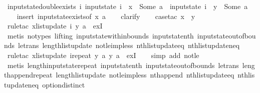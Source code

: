 \begin{isabellebody}
\endisatagproof
{\isafoldproof}%
%
\isadelimproof
\isanewline
%
\endisadelimproof
\isanewline
{}\isamarkupfalse%
\ input{}state{\isacharunderscore}double{\isacharunderscore}exists{\isacharcolon}\ {\isachardoublequoteopen}{\isasymexists}i{\isachardot}\ input{}state\ i\ {\isachardollar}\ x\ {\isacharequal}\ Some\ a\ {\isasymand}\ input{}state\ i\ {\isachardollar}\ y\ {\isacharequal}\ Some\ a{\isachardoublequoteclose}\isanewline
%
\isadelimproof
\ \ %
\endisadelimproof
%
\isatagproof
{}\isamarkupfalse%
\ {\isacharparenleft}insert\ input{}state{\isacharunderscore}exists{\isacharbrackleft}of\ x\ a{\isacharbrackright}{\isacharparenright}\isanewline
\ \ \isamarkupfalse%
\ clarify\isanewline
\ \ \isamarkupfalse%
\ {\isacharparenleft}case{\isacharunderscore}tac\ {\isachardoublequoteopen}x\ {\isasymge}\ y{\isachardoublequoteclose}{\isacharparenright}\isanewline
\ \ \isamarkupfalse%
\ {\isacharparenleft}rule{\isacharunderscore}tac\ x{\isacharequal}{\isachardoublequoteopen}list{\isacharunderscore}update\ i\ y\ a{\isachardoublequoteclose}\ \ exI{\isacharparenright}\isanewline
\ \ \isamarkupfalse%
\ {\isacharparenleft}metis\ {\isacharparenleft}no{\isacharunderscore}types{\isacharcomma}\ lifting{\isacharparenright}\ input{}state{\isacharunderscore}within{\isacharunderscore}bounds\ input{}state{\isacharunderscore}nth\ input{}state{\isacharunderscore}out{\isacharunderscore}of{\isacharunderscore}bounds\ le{\isacharunderscore}trans\ length{\isacharunderscore}list{\isacharunderscore}update\ not{\isacharunderscore}le{\isacharunderscore}imp{\isacharunderscore}less\ nth{\isacharunderscore}list{\isacharunderscore}update{\isacharunderscore}eq\ nth{\isacharunderscore}list{\isacharunderscore}update{\isacharunderscore}neq{\isacharparenright}\isanewline
\ \ \isamarkupfalse%
\ {\isacharparenleft}rule{\isacharunderscore}tac\ x{\isacharequal}{\isachardoublequoteopen}list{\isacharunderscore}update\ {\isacharparenleft}i{\isacharat}{\isacharparenleft}repeat\ y\ a{\isacharparenright}{\isacharparenright}\ y\ a{\isachardoublequoteclose}\ \ exI{\isacharparenright}\isanewline
\ \ \isamarkupfalse%
\ {\isacharparenleft}simp\ add{\isacharcolon}\ not{\isacharunderscore}le{\isacharparenright}\isanewline
\ \ \isamarkupfalse%
\ {\isacharparenleft}metis\ length{\isacharunderscore}input{}state{\isacharunderscore}repeat\ input{}state{\isacharunderscore}nth\ input{}state{\isacharunderscore}out{\isacharunderscore}of{\isacharunderscore}bounds\ le{\isacharunderscore}trans\ length{\isacharunderscore}append{\isacharunderscore}repeat\ length{\isacharunderscore}list{\isacharunderscore}update\ not{\isacharunderscore}le{\isacharunderscore}imp{\isacharunderscore}less\ nth{\isacharunderscore}append\ nth{\isacharunderscore}list{\isacharunderscore}update{\isacharunderscore}eq\ nth{\isacharunderscore}list{\isacharunderscore}update{\isacharunderscore}neq\ option{\isachardot}distinct{\isacharparenleft}{}{\isacharparenright}{\isacharparenright}%

\end{isabellebody}
